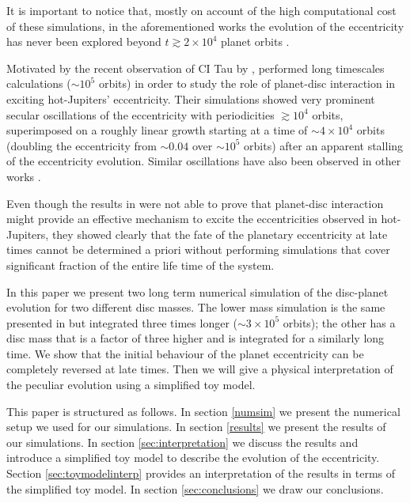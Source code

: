 \documentclass[usenatbib,a4paper,times,fleqn]{mnras}
\begin{document}
It is important to notice that, mostly on account of the high computational cost of these simulations, in the aforementioned works the evolution of the eccentricity has never been explored beyond $t\gtrsim 2\times 10^4 $ planet orbits \citep{thun2017}.

Motivated by the recent observation of CI Tau by \citet{krull2016}, \citet{rosotti2017} performed long timescales calculations ($\sim 10^5$ orbits) in order to study the role of planet-disc interaction in exciting hot-Jupiters' eccentricity. Their simulations showed very prominent secular oscillations of the eccentricity with periodicities $\gtrsim 10^4$ orbits, superimposed on a roughly linear growth starting at a time of $\sim 4 \times 10^4$ orbits (doubling the eccentricity from $\sim 0.04$ over $\sim 10^5$ orbits) after an apparent stalling of the eccentricity evolution. Similar oscillations have also been observed in other works \citep{duffell2015,muller2013,bitsch2013,dunhill2013,thun2017}.

Even though the results in \citet{rosotti2017} were not able to prove that planet-disc interaction might provide an effective mechanism to excite the eccentricities observed in hot-Jupiters, they showed clearly that the fate of the planetary eccentricity at late times cannot be determined a priori without performing simulations that cover significant fraction of the entire life time of the system.

In this paper we present two long term numerical simulation of the disc-planet evolution for two different disc masses.
The lower mass simulation is the same presented in \citet{rosotti2017} but integrated three times longer ($\sim 3\times 10^5$ orbits); the other has a disc mass that is a factor of three higher and is integrated for a similarly long time. We show that the initial behaviour of the planet eccentricity can be completely reversed at late times. Then we will give a physical interpretation of the peculiar evolution using a simplified toy model.

This paper is structured as follows. In section \ref{numsim} we present the numerical setup we used for our simulations. In section \ref{results} we present the results of our simulations. In section \ref{sec:interpretation} we discuss the results and introduce a simplified toy model to describe the evolution of the eccentricity. Section \ref{sec:toymodelinterp} provides an interpretation of the results in terms of the simplified toy model. In section \ref{sec:conclusions} we draw our conclusions.
\end{document}
